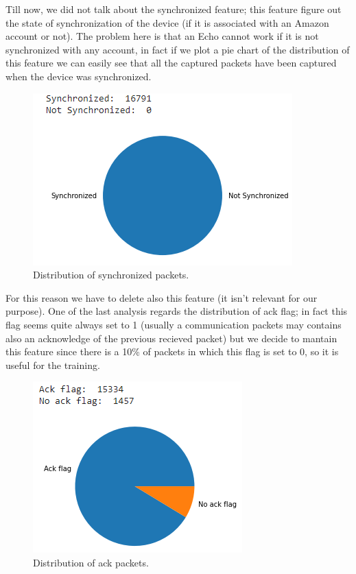 \documentclass[sigconf]{acmart}
\begin{document}
    Till now, we did not talk about the synchronized feature; this feature figure out the state of synchronization of the device (if it is associated with an Amazon account or not). The problem here is that an Echo cannot work if it is not synchronized with any account, in fact if we plot a pie chart of the distribution of this feature we can easily see that all the captured packets have been captured when the device was synchronized.
    \begin{figure}[h!]
        \includegraphics[width=0.8\linewidth]{img/syn_not_syn.png}
        \caption{Distribution of synchronized packets.}
        \label{fig:syn_not_syn}
    \end{figure}

    For this reason we have to delete also this feature (it isn't relevant for our purpose). One of the last analysis regards the distribution of ack flag; in fact this flag seems quite always set to 1 (usually a communication packets may contains also an acknowledge of the previous recieved packet) but we decide to mantain this feature since there is a 10\% of packets in which this flag is set to 0, so it is useful for the training.


    \begin{figure}[h!]
        \includegraphics[width=0.8\linewidth]{img/ack_no_ack.png}
        \caption{Distribution of ack packets.}
        \label{fig:ack_not_ack}
    \end{figure}
\end{document}
